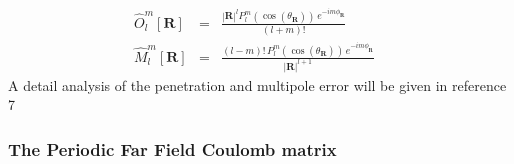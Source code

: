 \documentclass[prb,aps,nobibnotes,twocolumn,doublespace,twocolumngrid,superbib]{revtex4}
\begin{document}
\begin{eqnarray}
\widehat{O}_{l}^{m}\left[ {\mathbf{R}}\right]  & = & \frac{\left| {\mathbf{R}}\right| ^{l}P_{l}^{m}
\left( \cos \left( \theta _{\mathbf{R}}\right) \right) \, e^{-im\phi _{\mathbf{R}}}}{\left( l+m\right) !}
\begin{array}{c}
\\

\end{array}\label{sp_mult_O} \\
\widehat{M}_{l}^{m}\left[ {\mathbf{R}}\right]  & = & \frac{\left( l-m\right) !\, P_{l}^{m}\left( \cos \left( 
\theta _{\mathbf{R}}\right) \right) \, e^{-im\phi _{\mathbf{R}}}}{\left| {\mathbf{R}}\right| ^{l+1}}
\begin{array}{c}
\\

\end{array}\label{sp_mult_M} 
\end{eqnarray}
A detail analysis of the penetration and  multipole error will be given in
reference 7 


\subsubsection{The Periodic Far Field Coulomb matrix}
\end{document}
